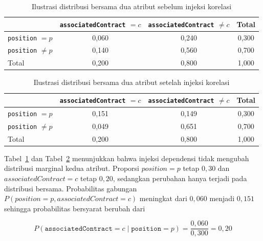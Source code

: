 \begin{table}[htbp]
    \centering
    \caption{Ilustrasi distribusi bersama dua atribut sebelum injeksi korelasi}
    \label{tab:ilustrasi-korelasi-sebelum}
    \begin{tabular}{lccc}
        \hline
         & \texttt{associatedContract} $=c$
         & \texttt{associatedContract} $\neq c$
         & Total \\
        \hline
        \texttt{position} $=p$
        & 0,060
        & 0,240
        & 0,300 \\
        \texttt{position} $\neq p$
        & 0,140
        & 0,560
        & 0,700 \\
        \hline
        Total
        & 0,200
        & 0,800
        & 1,000 \\
        \hline
    \end{tabular}
\end{table}

\begin{table}[htbp]
    \centering
    \caption{Ilustrasi distribusi bersama dua atribut setelah injeksi korelasi}
    \label{tab:ilustrasi-korelasi-sesudah}
    \begin{tabular}{lccc}
        \hline
         & \texttt{associatedContract} $=c$
         & \texttt{associatedContract} $\neq c$
         & Total \\
        \hline
        \texttt{position} $=p$
        & 0,151
        & 0,149
        & 0,300 \\
        \texttt{position} $\neq p$
        & 0,049
        & 0,651
        & 0,700 \\
        \hline
        Total
        & 0,200
        & 0,800
        & 1,000 \\
        \hline
    \end{tabular}
\end{table}

Tabel~\ref{tab:ilustrasi-korelasi-sebelum} dan
Tabel~\ref{tab:ilustrasi-korelasi-sesudah}
menunjukkan bahwa injeksi dependensi tidak mengubah distribusi marginal kedua atribut. 
Proporsi $position=p$ tetap $0,30$ dan $associatedContract=c$ tetap $0,20$, sedangkan perubahan hanya terjadi pada distribusi bersama. 
Probabilitas gabungan $P(position=p, associatedContract=c)$ meningkat dari $0,060$ menjadi $0,151$ sehingga probabilitas bersyarat berubah dari

\begin{equation}
P(\texttt{associatedContract}=c \mid \texttt{position}=p)
=
\frac{0{,}060}{0{,}300}
=
0{,}20
\end{equation}

